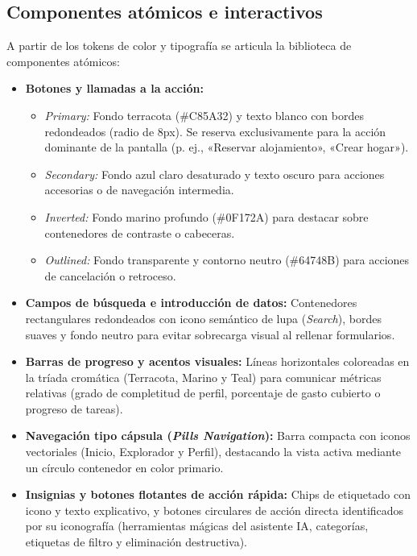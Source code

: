 \subsection{Componentes atómicos e interactivos}

A partir de los tokens de color y tipografía se articula la biblioteca de componentes atómicos:

\begin{itemize}
    \item \textbf{Botones y llamadas a la acción:}
    \begin{itemize}
        \item \emph{Primary:} Fondo terracota (\#C85A32) y texto blanco con bordes redondeados (radio de 8px). Se reserva exclusivamente para la acción dominante de la pantalla (p. ej., «Reservar alojamiento», «Crear hogar»).
        \item \emph{Secondary:} Fondo azul claro desaturado y texto oscuro para acciones accesorias o de navegación intermedia.
        \item \emph{Inverted:} Fondo marino profundo (\#0F172A) para destacar sobre contenedores de contraste o cabeceras.
        \item \emph{Outlined:} Fondo transparente y contorno neutro (\#64748B) para acciones de cancelación o retroceso.
    \end{itemize}

    \item \textbf{Campos de búsqueda e introducción de datos:} Contenedores rectangulares redondeados con icono semántico de lupa (\emph{Search}), bordes suaves y fondo neutro para evitar sobrecarga visual al rellenar formularios.

    \item \textbf{Barras de progreso y acentos visuales:} Líneas horizontales coloreadas en la tríada cromática (Terracota, Marino y Teal) para comunicar métricas relativas (grado de completitud de perfil, porcentaje de gasto cubierto o progreso de tareas).

    \item \textbf{Navegación tipo cápsula (\emph{Pills Navigation}):} Barra compacta con iconos vectoriales (Inicio, Explorador y Perfil), destacando la vista activa mediante un círculo contenedor en color primario.

    \item \textbf{Insignias y botones flotantes de acción rápida:} Chips de etiquetado con icono y texto explicativo, y botones circulares de acción directa identificados por su iconografía (herramientas mágicas del asistente IA, categorías, etiquetas de filtro y eliminación destructiva).
\end{itemize}

